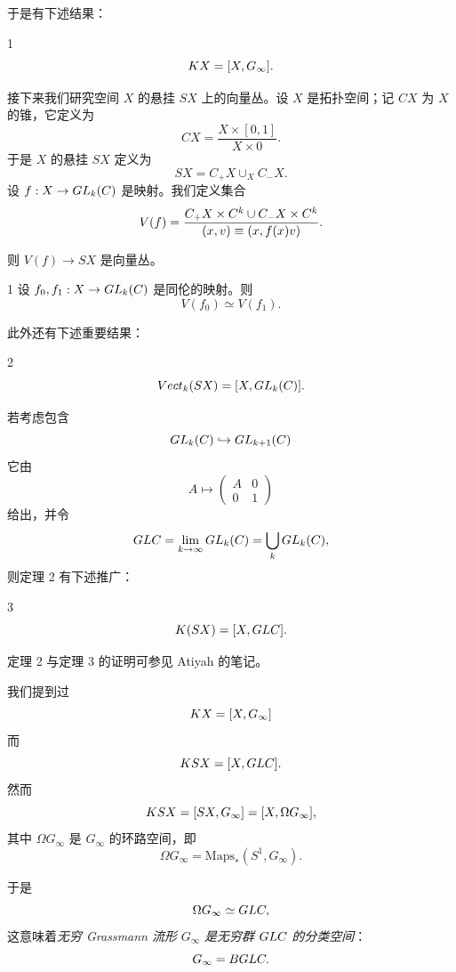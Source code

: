 于是有下述结果：
\begin{thm}{1}
\[  K X = [X, G_\infty]. \]
\end{thm}


接下来我们研究空间 $X$ 的悬挂 $SX$ 上的向量丛。设 $X$ 是拓扑空间；记 $CX$ 为 $X$ 的锥，它定义为
\[ CX = \frac{X\times[0,1]}{X\times 0}. \]
于是 $X$ 的悬挂 $SX$ 定义为
\[ SX = C_+X\cup_X C_-X. \]
设 $f : X\to GL_k(C)$ 是映射。我们定义集合
\[ V(f) = \frac{C_+X\times C^k\cup C_-X\times C^k}{(x,v)\equiv(x,f(x)v)}. \]

则 $V(f)\to SX$ 是向量丛。

\begin{lem}{1}
设 $f_0, f_1 : X\to GL_k(C)$ 是同伦的映射。则
\[ V(f_0)\simeq V(f_1). \]
\end{lem}

此外还有下述重要结果：
\begin{thm}{2}
\[ Vect_k(SX) = [X, GL_k(C)]. \]
\end{thm}

若考虑包含
\[ GL_k(C)\hookrightarrow GL_{k+1}(C) \]
它由
\[ A\mapsto\begin{pmatrix} A & 0 \\ 0 & 1 \end{pmatrix} \]
给出，并令
\[ GLC = \lim_{k\to\infty}GL_k(C) = \bigcup_k GL_k(C), \]
则定理 2 有下述推广：
\begin{thm}{3}
\[  K(SX) = [X, GLC]. \]
\end{thm}

定理 2 与定理 3 的证明可参见 Atiyah 的笔记。


我们提到过
\[  K X = [X, G_\infty] \]
而
\[  K SX = [X, GLC]. \]
然而
\[  K SX = [SX, G_\infty] = [X, \Omega G_\infty], \]
其中 $\Omega G_\infty$ 是 $G_\infty$ 的环路空间，即
\[ \Omega G_\infty = \mathrm{Maps}_*(S^1, G_\infty). \]

于是
\[ \Omega G_\infty \simeq GLC, \]
这意味着\emph{无穷 Grassmann 流形} $G_\infty$ \emph{是无穷群} $GLC$ \emph{的分类空间}：
\[ G_\infty = BGLC. \]

